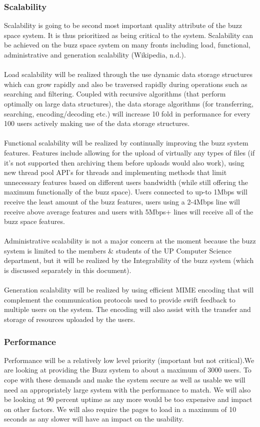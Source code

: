 \subsubsection{Scalability}
Scalability is going to be second most important quality attribute of the buzz space system. It is thus prioritized as being critical to the system. Scalability can be achieved on the buzz space system on many fronts including load, functional, administrative and generation scalability (Wikipedia, n.d.).\\
\\
Load scalability will be realized through the use dynamic data storage structures which can grow rapidly and also be traversed rapidly during operations such as searching and filtering. Coupled with recursive algorithms (that perform optimally on large data structures), the data storage algorithms (for transferring, searching, encoding/decoding etc.) will increase 10 fold in performance for every 100 users actively making use of the data storage structures.\\
\\
Functional scalability will be realized by continually improving the buzz system features. Features include allowing for the upload of virtually any types of files (if it’s not supported then archiving them before uploads would also work), using new thread pool API’s for threads and implementing methods that limit unnecessary features based on different users bandwidth (while still offering the maximum functionally of the buzz space). Users connected to up-to 1Mbps will receive the least amount of the buzz features, users using a 2-4Mbps line will receive above average features and users with 5Mbps+ lines will receive all of the buzz space features.\\
\\ 
Administrative scalability is not a major concern at the moment because the buzz system is limited to the members & students of the UP Computer Science department, but it will be realized by the Integrability of the buzz system (which is discussed separately in this document).\\
\\
Generation scalability will be realized by using efficient MIME encoding that will complement the communication protocols used to provide swift feedback to multiple users on the system. The encoding will also assist with the transfer and storage of resources uploaded by the users.     
\subsubsection{Performance}
Performance will be a relatively low level priority (important but not critical).We are looking at providing the Buzz system to about a maximum of 3000 users. To cope with these demands and make the system secure as well as usable we will need an appropriately large system with the performance to match. We will also be looking at 90 percent uptime as any more would be too expensive and impact on other factors. We will also require the pages to load in a maximum of 10 seconds as any slower will have an impact on the usability.
